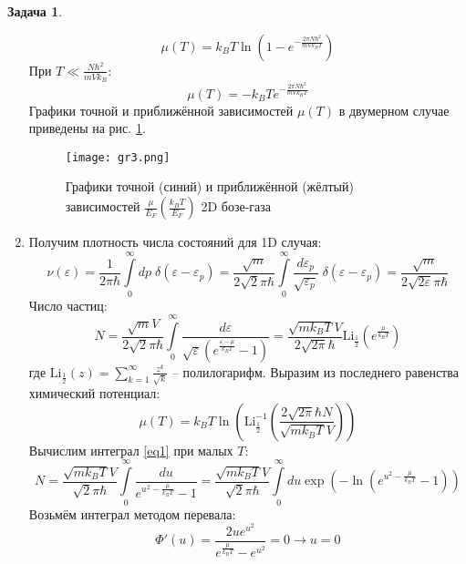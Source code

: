 \documentclass[12pt]{article}
\theoremstyle{definition}
\newtheorem{zad}{Задача}[section]
\begin{document}
\begin{zad}
\begin{enumerate}
\begin{equation}
    \boxed{\mu(T)=k_BT\ln\left(1-e^{-\frac{2\pi N\hbar^2}{mVk_BT}}\right)}
\end{equation}
При $T\ll\frac{N\hbar^2}{mVk_B}$:
\begin{equation}
    \boxed{\mu(T)=-k_BTe^{-\frac{2\pi N\hbar^2}{mVk_BT}}}
\end{equation}
Графики точной и приближённой зависимостей $\mu(T)$ в двумерном случае приведены на рис. \ref{gr3}.
\begin{figure}
    \centering
    \texttt{[image: gr3.png]}
    \caption{Графики точной (синий) и приближённой (жёлтый) зависимостей $\frac{\mu}{E_F}\left(\frac{k_BT}{E_F}\right)$ 2D бозе-газа}
    \label{gr3}
\end{figure}
\item Получим плотность числа состояний для 1D случая:
\begin{equation}
    \nu(\varepsilon)=\frac{1}{2\pi\hbar}\int\limits_0^\infty dp\;\delta(\varepsilon-\varepsilon_p)=\frac{\sqrt{m}}{2\sqrt{2}\pi\hbar}\int\limits_0^\infty \frac{d\varepsilon_p}{\sqrt{\varepsilon_p}}\;\delta(\varepsilon-\varepsilon_p)=\frac{\sqrt{m}}{2\sqrt{2\varepsilon}\pi\hbar}
\end{equation}
Число частиц:
\begin{equation}\label{eq1}
    N=\frac{\sqrt{m}V}{2\sqrt{2}\pi\hbar}\int\limits_0^\infty\frac{d\varepsilon}{\sqrt{\varepsilon}\left(e^{\frac{\varepsilon-\mu}{k_BT}}-1\right)}=\frac{\sqrt{mk_BT}V}{2\sqrt{2\pi}\hbar}\text{Li}_\frac{1}{2}\left(e^\frac{\mu}{k_BT}\right)
\end{equation}
где $\text{Li}_\frac{1}{2}(z)=\sum\limits_{k=1}^\infty\frac{z^k}{\sqrt{k}}$ -- полилогарифм. Выразим из последнего равенства химический потенциал:
\begin{equation}
    \boxed{\mu(T)=k_BT\ln\left(\text{Li}^{-1}_\frac{1}{2}\left(\frac{2\sqrt{2\pi}\hbar N}{\sqrt{mk_BT}V}\right)\right)}
\end{equation}
Вычислим интеграл \ref{eq1} при малых $T$:
\begin{equation}
    N=\frac{\sqrt{mk_BT}V}{\sqrt{2}\pi\hbar}\int\limits_0^\infty\frac{du}{e^{u^2-\frac{\mu}{k_BT}}-1}=\frac{\sqrt{mk_BT}V}{\sqrt{2}\pi\hbar}\int\limits_0^\infty du\exp\left(-\ln\left(e^{u^2-\frac{\mu}{k_BT}}-1\right)\right)
\end{equation}
Возьмём интеграл методом перевала:
\begin{equation}
    \Phi'(u)=\frac{2ue^{u^2}}{e^\frac{\mu}{k_BT}-e^{u^2}}=0\rightarrow u=0
\end{equation}
\begin{equation}

\end{equation}
\end{enumerate}
\end{zad}
\end{document}
